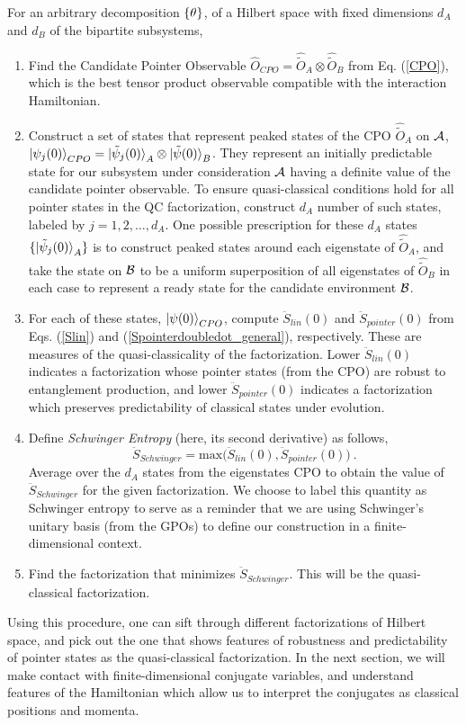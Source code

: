 \documentclass[aps,pra,onecolumn,nofootinbib,12pt,tightenlines]{revtex4-1}
\begin{document}
For an arbitrary decomposition ${\{\theta\}}$, {of a Hilbert space with fixed dimensions $d_A$ and $d_B$ of the bipartite subsystems,}
\begin{enumerate}
\item{Find the Candidate Pointer Observable $\hat{O}_{CPO} = \hat{\tilde{O}}_{A} \otimes \hat{\tilde{O}}_{B} $ from Eq. (\ref{CPO}), which is the best tensor product observable compatible with the interaction Hamiltonian. }
\item{Construct a set of states that represent peaked states of the CPO $\hat{\tilde{O}}_{A}$ on $\mathcal{A}$, $\ket{\psi_{j}(0)}_{CPO} = \ket{\tilde{\psi}_{j} (0)}_{A} \otimes \ket{\tilde{\psi} (0)}_{B}$. They represent an initially predictable state for our subsystem under consideration $\mathcal{A}$ having a definite value of the candidate pointer observable. To ensure quasi-classical conditions hold for all pointer states in the QC factorization, construct $d_A$ number of such states, labeled by $j = 1,2,\ldots,d_{A}$. One possible prescription for these $d_A$ states $\{\ket{\tilde{\psi}_{j} (0)}_{A}\}$ is to construct peaked states around each eigenstate of $\hat{\tilde{O}}_{A}$, and take the state on $\mathcal{B}$ to be a uniform superposition of all eigenstates of $\hat{\tilde{O}}_{B}$ in each case to represent a ready state for the candidate environment $\mathcal{B}$. }
\item{For each of these states, $\ket{\psi(0)}_{CPO}$, compute $\ddot{S}_{lin}(0)$ and $\ddot{S}_{pointer}(0)$ from Eqs. (\ref{Slin}) and (\ref{Spointerdoubledot_general}), respectively. These are measures of the quasi-classicality of the factorization. Lower $\ddot{S}_{lin}(0)$ indicates a factorization whose pointer states (from the CPO) are robust to entanglement production, and lower $\ddot{S}_{pointer}(0)$ indicates a factorization which preserves predictability of classical states under evolution.}
\item{Define \emph{Schwinger Entropy} (here, its second derivative) as follows,
\begin{equation}
\label{S_schwinger}
\ddot{S}_{Schwinger} = \mathrm{max} \biggl(\ddot{S}_{lin}(0), \ddot{S}_{pointer}(0) \biggr) \: .
\end{equation}
Average over the $d_A$ states from the eigenstates CPO to obtain the value of $\ddot{S}_{Schwinger}$ for the given factorization. We choose to label this quantity as Schwinger entropy to serve as a reminder that we are  using Schwinger's unitary basis (from the GPOs) to define our construction in a finite-dimensional context.}
\item{Find the factorization that minimizes $\ddot{S}_{Schwinger}$. This will be the quasi-classical factorization.}
\end{enumerate}
Using this procedure, one can sift through different factorizations of Hilbert space, and pick out the one that shows features of robustness and predictability of pointer states as the quasi-classical factorization. In the next section, we will make contact with finite-dimensional conjugate variables, and understand features of the Hamiltonian which allow us to interpret the conjugates as classical positions and momenta.
\end{document}
